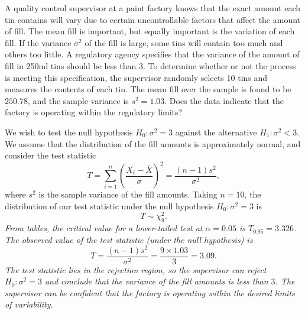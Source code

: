 \begin{exercise} %
A quality control supervisor at a paint factory knows that the exact amount each tin contains will vary due to certain uncontrollable factors that affect the amount of fill. The mean fill is important, but equally important is the variation of each fill. If the variance $\sigma^2$ of the fill is large, some tins will contain too much and others too little. A regulatory agency specifies that the variance of the amount of fill in 250ml tins should be less than $3$. To determine whether or not the process is meeting this specification, the supervisor randomly selects 10 tins and measures the contents of each tin. The mean fill over the sample is found to be $250.78$, and the sample variance is $s^2 = 1.03$. Does the data indicate that the factory is operating within the regulatory limits?
\begin{answer}
We wish to test the null hypothesis $H_0:\sigma^2 = 3$ against the alternative $H_1:\sigma^2 < 3$. We assume that the distribution of the fill amounts is approximately normal, and consider the test statistic 
\[
T = \sum_{i=1}^{n} \left(\frac{X_i-\bar{X}}{\sigma}\right)^2 = \frac{(n-1)s^2}{\sigma^2},
\]
where $s^2$ is the sample variance of the fill amounts. Taking $n=10$, the distribution of our test statistic under the null hypothesis $H_0:\sigma^2 = 3$ is
\[
T \sim \chi^2_9.
\]
\bit
\it From tables, the critical value for a lower-tailed test at $\alpha=0.05$ is $T_{0.95} = 3.326$.
\it The observed value of the test statistic (under the null hypothesis) is
\[
T = \frac{(n-1)s^2}{\sigma^2} = \frac{9\times 1.03}{3} = 3.09.
\]
\eit 
The test statistic lies in the rejection region, so the supervisor can reject $H_0:\sigma^2=3$ and conclude that the variance of the fill amounts is less than $3$. The supervisor can be confident that the factory is operating within the desired limits of variability. 
\end{answer}
\end{exercise}
%
